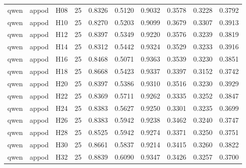 \begin{table}[tbp]
\begin{tabular}{lllrrrrrrr}
qwen & appod & H08 & 25 & 0.8326 & 0.5120 & 0.9032 & 0.3578 & 0.3228 & 0.3792 \\
qwen & appod & H10 & 25 & 0.8270 & 0.5203 & 0.9099 & 0.3679 & 0.3307 & 0.3913 \\
qwen & appod & H12 & 25 & 0.8397 & 0.5349 & 0.9220 & 0.3576 & 0.3239 & 0.3819 \\
qwen & appod & H14 & 25 & 0.8312 & 0.5442 & 0.9324 & 0.3529 & 0.3233 & 0.3916 \\
qwen & appod & H16 & 25 & 0.8468 & 0.5071 & 0.9363 & 0.3539 & 0.3230 & 0.3851 \\
qwen & appod & H18 & 25 & 0.8668 & 0.5423 & 0.9337 & 0.3397 & 0.3152 & 0.3742 \\
qwen & appod & H20 & 25 & 0.8397 & 0.5386 & 0.9310 & 0.3516 & 0.3230 & 0.3929 \\
qwen & appod & H22 & 25 & 0.8369 & 0.5711 & 0.9262 & 0.3335 & 0.3252 & 0.3847 \\
qwen & appod & H24 & 25 & 0.8383 & 0.5627 & 0.9250 & 0.3301 & 0.3235 & 0.3699 \\
qwen & appod & H26 & 25 & 0.8383 & 0.5942 & 0.9238 & 0.3462 & 0.3240 & 0.3747 \\
qwen & appod & H28 & 25 & 0.8525 & 0.5942 & 0.9274 & 0.3371 & 0.3250 & 0.3751 \\
qwen & appod & H30 & 25 & 0.8661 & 0.5837 & 0.9214 & 0.3415 & 0.3260 & 0.3822 \\
qwen & appod & H32 & 25 & 0.8839 & 0.6090 & 0.9347 & 0.3426 & 0.3257 & 0.3700 \\
\bottomrule
\end{tabular}
\end{table}
